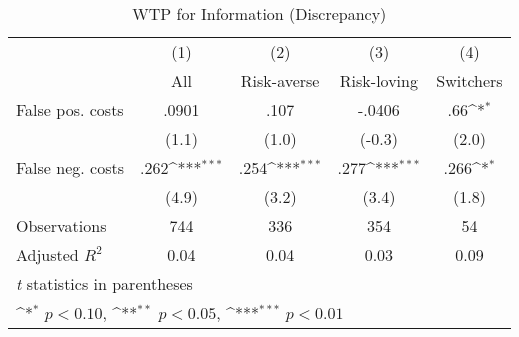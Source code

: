 \begin{table}[htbp]\centering
\def\sym#1{\ifmmode^{#1}\else\(^{#1}\)\fi}
\caption{WTP for Information (Discrepancy)}
\begin{tabular}{l*{4}{c}}
\hline\hline
                &\multicolumn{1}{c}{(1)}&\multicolumn{1}{c}{(2)}&\multicolumn{1}{c}{(3)}&\multicolumn{1}{c}{(4)}\\
                &\multicolumn{1}{c}{All}&\multicolumn{1}{c}{Risk-averse}&\multicolumn{1}{c}{Risk-loving}&\multicolumn{1}{c}{Switchers}\\
\hline
False pos. costs&    .0901         &     .107         &   -.0406         &      .66\sym{*}  \\
                &    (1.1)         &    (1.0)         &   (-0.3)         &    (2.0)         \\
False neg. costs&     .262\sym{***}&     .254\sym{***}&     .277\sym{***}&     .266\sym{*}  \\
                &    (4.9)         &    (3.2)         &    (3.4)         &    (1.8)         \\
\hline
Observations    &      744         &      336         &      354         &       54         \\
Adjusted \(R^{2}\)&     0.04         &     0.04         &     0.03         &     0.09         \\
\hline\hline
\multicolumn{5}{l}{\footnotesize \textit{t} statistics in parentheses}\\
\multicolumn{5}{l}{\footnotesize \sym{*} \(p<0.10\), \sym{**} \(p<0.05\), \sym{***} \(p<0.01\)}\\
\end{tabular}
\end{table}
